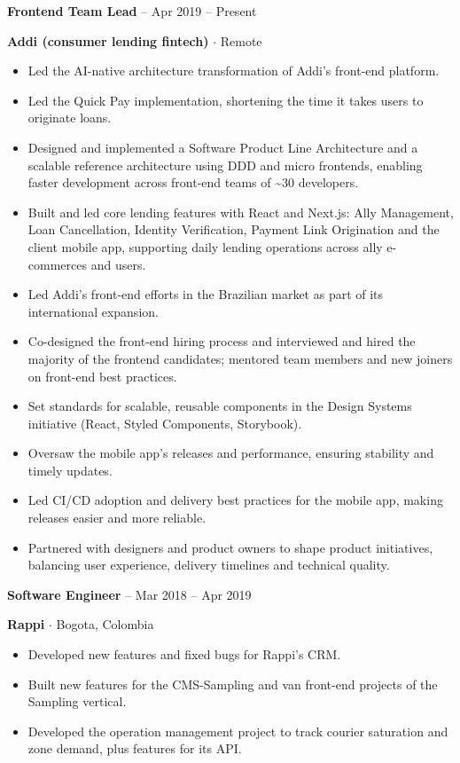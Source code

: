 \documentclass[10pt,a4paper]{article}
\newcommand{\job}[4]{%
  \vspace{5pt}%
  \textbf{#1} -- #2\par
  \textbf{#3} $\cdot$ #4\par}
\begin{document}
\begin{minipage}[t]{0.71\textwidth}
\job{Frontend Team Lead}{Apr 2019 -- Present}{Addi (consumer lending fintech)}{Remote}
\begin{itemize}
  \item Led the AI-native architecture transformation of Addi's front-end platform.
  \item Led the Quick Pay implementation, shortening the time it takes users to originate loans.
  \item Designed and implemented a Software Product Line Architecture and a scalable reference
        architecture using DDD and micro frontends, enabling faster development across front-end
        teams of \textasciitilde30 developers.
  \item Built and led core lending features with React and Next.js: Ally Management, Loan
        Cancellation, Identity Verification, Payment Link Origination and the client mobile app,
        supporting daily lending operations across ally e-commerces and users.
  \item Led Addi's front-end efforts in the Brazilian market as part of its international expansion.
  \item Co-designed the front-end hiring process and interviewed and hired the majority of the
        frontend candidates; mentored team members and new joiners on front-end best practices.
  \item Set standards for scalable, reusable components in the Design Systems initiative
        (React, Styled Components, Storybook).
  \item Oversaw the mobile app's releases and performance, ensuring stability and timely updates.
  \item Led CI/CD adoption and delivery best practices for the mobile app, making releases easier
        and more reliable.
  \item Partnered with designers and product owners to shape product initiatives, balancing user
        experience, delivery timelines and technical quality.
\end{itemize}

\job{Software Engineer}{Mar 2018 -- Apr 2019}{Rappi}{Bogota, Colombia}
\begin{itemize}
  \item Developed new features and fixed bugs for Rappi's CRM.
  \item Built new features for the CMS-Sampling and van front-end projects of the Sampling vertical.
  \item Developed the operation management project to track courier saturation and zone demand,
        plus features for its API.
\end{itemize}


\end{minipage}
\end{document}
